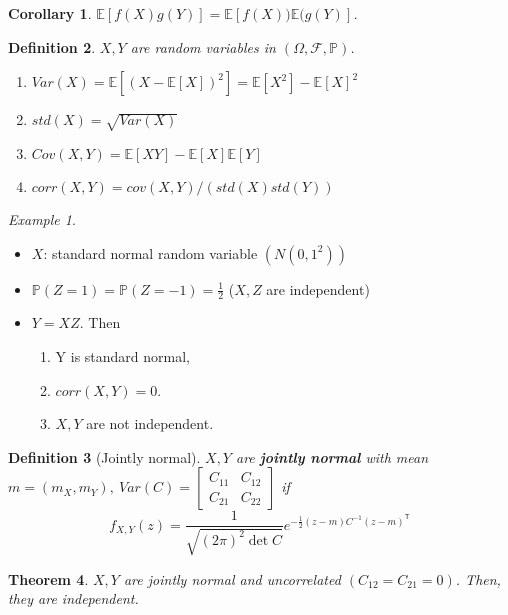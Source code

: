 \documentclass[12pt]{report}
\renewcommand{\P}{\mathbb{P}}
\newcommand{\F}{\mathcal{F}}
\newcommand{\E}{\mathbb{E}}
\renewcommand{\1}{\mathbb{1}}
\renewcommand{\O}{\Omega}
\theoremstyle{break}
\newtheorem{thm}{Theorem}[section] %
\theoremstyle{newdef}
\newtheorem{defn}[thm]{Definition} %
\newtheorem{cor}[thm]{Corollary}
\theoremstyle{remark}
\newtheorem*{exmp}{Example} %
\begin{document}
\begin{cor}
$\mathbb{E}[f(X)g(Y)] = \mathbb{E}[f(X))\mathbb{E}(g(Y)]$.
\end{cor}



\begin{defn}
$X,Y$ are random variables in $(\O,\F,\P)$.
\begin{enumerate}
\item $Var(X) = \E[(X-\E[X])^2] = \E[X^2] - \E[X]^2$
\item $std(X) = \sqrt{Var(X)}$
\item $Cov(X,Y) = \E[XY] - \E[X]\E[Y]$
\item $corr(X,Y) = cov(X,Y) / (std(X)std(Y))$
\end{enumerate}
\end{defn}

\begin{exmp}
\leavevmode
\vspace{-6mm}
\begin{itemize}
\item $X$: standard normal random variable $(N(0,1^2))$
\item $\P(Z = 1) = \P(Z = -1) = \frac{1}{2}$ ($X,Z$ are independent)
\item $Y = XZ $. Then
\begin{enumerate}[label = \arabic*)]
\item Y is standard normal,
\item $corr(X,Y) = 0$.
\item $X,Y$ are not independent.
\end{enumerate}
\end{itemize}
\end{exmp}



\begin{defn}[Jointly normal]
$X, Y$ are \textbf{jointly normal} with mean $m = (m_X, m_Y),\ Var(C) = 
\begin{bmatrix}
    C_{11} & C_{12} \\
    C_{21} & C_{22}
\end{bmatrix}
$ if
$$f_{X,Y}(z) = \frac{1}{\sqrt{(2\pi)^2\det C}}e^{-\frac{1}{2}(z-m)C^{-1}(z-m)^\mathsf{T}}$$
\end{defn}

\begin{thm}
$X,Y$ are jointly normal and uncorrelated $(C_{12} = C_{21} = 0)$.
Then, they are independent.
\end{thm}
\end{document}
